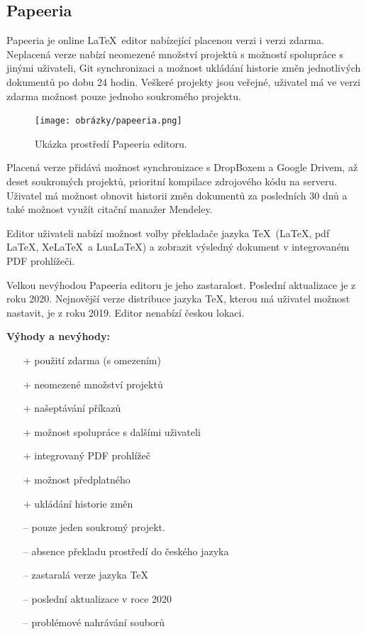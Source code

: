 \subsection{Papeeria}
Papeeria je online \LaTeX\ editor nabízející placenou verzi i verzi zdarma. Neplacená verze nabízí neomezené množství projektů s možností spolupráce s jinými uživateli, Git synchronizaci a možnost ukládání historie změn jednotlivých dokumentů po dobu 24 hodin. Veškeré projekty jsou veřejné, uživatel má ve verzi zdarma možnost pouze jednoho soukromého projektu. \cite{Papeeria}\cite{Papeeriafeatures}

\begin{figure}[h]
	\centering
	\texttt{[image: obrázky/papeeria.png]}
	\caption[Ukázka prostředí Papeeria editoru.]{Ukázka prostředí Papeeria editoru. \cite{Papeeriaimg}}
	\label{fig:papeeria}
\end{figure}

Placená verze přidává možnost synchronizace s DropBoxem a Google Drivem, až deset soukromých projektů, prioritní kompilace zdrojového kódu na serveru. Uživatel má možnost obnovit historii změn dokumentů za posledních 30 dnů a také možnost využít citační manažer Mendeley. \cite{Papeeriafeatures}

Editor uživateli nabízí možnost volby překladače jazyka \TeX\ (\LaTeX, pdf \LaTeX, Xe\LaTeX\ a Lua\LaTeX) a zobrazit výsledný dokument v integrovaném PDF prohlížeči.  \cite{Papeeria}

Velkou nevýhodou Papeeria editoru je jeho zastaralost. Poslední aktualizace je z roku 2020. Nejnovější verze distribuce jazyka \TeX, kterou má uživatel možnost nastavit, je z roku 2019. Editor nenabízí českou lokaci. \cite{Papeeria}

\textbf{Výhody a nevýhody:}
\begin{multicols}{2}
	\begin{itemize}
		\item [+] použití zdarma (s omezením)
		\item [+] neomezené množství projektů
		\item [+] našeptávání příkazů
		\item [+] možnost spolupráce s dalšími uživateli
		\item [+] integrovaný PDF prohlížeč
		\item [+] možnost předplatného
		\item [+] ukládání historie změn
	\columnbreak
		\item [--] pouze jeden soukromý projekt.
		\item [--] absence překladu prostředí do českého jazyka
		\item [--] zastaralá verze jazyka \TeX
		\item [--] poslední aktualizace v roce 2020
		\item [--] problémové nahrávání souborů
	\end{itemize}
\end{multicols}

